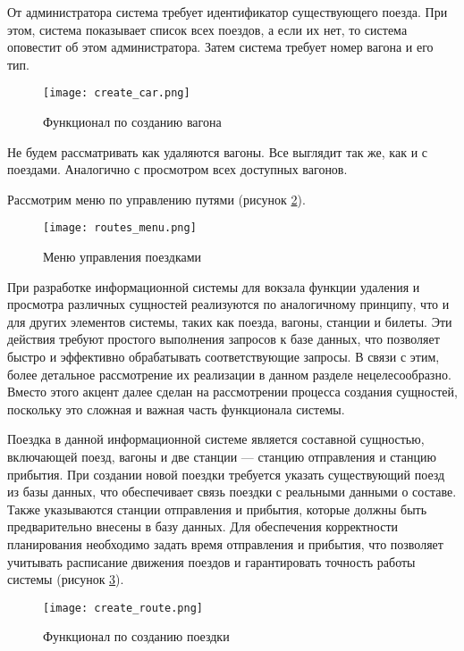 От администратора система требует идентификатор существующего поезда. При этом, система показывает список всех поездов, а если их нет, то система оповестит об этом администратора. Затем система требует номер вагона и его тип.

\begin{figure}[h]
    \centering
    \texttt{[image: create\_car.png]}
    \caption{Функционал по созданию вагона}
    \label{fig:create_carriage}
\end{figure}

Не будем рассматривать как удаляются вагоны. Все выглядит так же, как и с поездами. Аналогично с просмотром всех доступных вагонов.

Рассмотрим меню по управлению путями (рисунок \ref{fig:routes_menu}).

\begin{figure}[H]
    \centering
    \texttt{[image: routes\_menu.png]}
    \caption{Меню управления поездками}
    \label{fig:routes_menu}
\end{figure}

При разработке информационной системы для вокзала функции удаления и просмотра различных сущностей реализуются по аналогичному принципу, что и для других элементов системы, таких как поезда, вагоны, станции и билеты. Эти действия требуют простого выполнения запросов к базе данных, что позволяет быстро и эффективно обрабатывать соответствующие запросы. В связи с этим, более детальное рассмотрение их реализации в данном разделе нецелесообразно. Вместо этого акцент далее сделан на рассмотрении процесса создания сущностей, поскольку это сложная и важная часть функционала системы.

Поездка в данной информационной системе является составной сущностью, включающей поезд, вагоны и две станции — станцию отправления и станцию прибытия. При создании новой поездки требуется указать существующий поезд из базы данных, что обеспечивает связь поездки с реальными данными о составе. Также указываются станции отправления и прибытия, которые должны быть предварительно внесены в базу данных. Для обеспечения корректности планирования необходимо задать время отправления и прибытия, что позволяет учитывать расписание движения поездов и гарантировать точность работы системы (рисунок \ref{fig:create_route}).

\begin{figure}[H]
    \centering
    \texttt{[image: create\_route.png]}
    \caption{Функционал по созданию поездки}
    \label{fig:create_route}
\end{figure}

